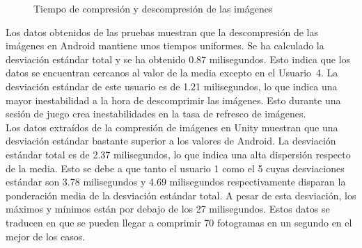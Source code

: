 \begin{figure}[h]
     \hfill
	\caption{Tiempo de compresi\'on y descompresi\'on de las im\'agenes}
     \label{}
   \end{figure}



Los datos obtenidos de las pruebas muestran que la descompresi\'on de las im\'agenes en Android mantiene unos tiempos uniformes. Se ha calculado la desviaci\'on est\'andar total y se ha obtenido 0.87 milisegundos. Esto indica que los datos se encuentran cercanos al valor de la media excepto en el Usuario~4. La desviaci\'on est\'andar de este usuario es de 1.21 milisegundos, lo que indica una mayor inestabilidad a la hora de descomprimir las im\'agenes. Esto durante una sesi\'on de juego crea inestabilidades en la tasa de refresco de im\'agenes. \\

Los datos extra\'idos de la compresi\'on de im\'agenes en Unity muestran que una desviaci\'on est\'andar bastante superior a los valores de Android. La desviaci\'on est\'andar total es de 2.37 milisegundos, lo que indica una alta dispersi\'on respecto de la media. Esto se debe a que tanto el usuario 1 como el 5 cuyas desviaciones est\'andar son 3.78 milisegundos y 4.69 milisegundos respectivamente disparan la ponderaci\'on media de la desviaci\'on est\'andar total. A pesar de esta desviaci\'on, los m\'aximos y m\'inimos est\'an por debajo de los 27 milisegundos.  Estos datos se traducen en que se pueden llegar a comprimir 70 fotogramas en un segundo en el mejor de los casos.\\



